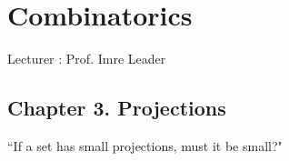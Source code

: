 \documentclass[12pt,a4paper]{report}
\DeclarePairedDelimiter\bignorm{\lVert}{\rVert}
\newcommand{\doublerule}[1][.4pt]{%
  \noindent
  \makebox[0pt][l]{\rule[.7ex]{\linewidth}{#1}}%
  \rule[.3ex]{\linewidth}{#1}}
\begin{document}
\newcommand{\thm}{\textbf{Theorem) }}
\newcommand{\thmnum}[1]{\textbf{Theorem #1) }}
\newcommand{\defi}{\textbf{Definition) }}
\newcommand{\lem}{\textbf{Lemma) }}
\newcommand{\lemnum}[1]{\textbf{Lemma #1) }}
\newcommand{\prop}{\textbf{Proposition) }}
\newcommand{\propnum}[1]{\textbf{Proposition #1) }}
\newcommand{\cor}{\textbf{Corollary) }}
\newcommand{\cornum}[1]{\textbf{Corollary #1) }}


\newcommand{\pf}{\textbf{proof) }}
\newcommand{\eop}{\hfill  \textsl{(End of proof)} $\square$} %


\newcommand{\lap}{\triangle} %
\newcommand{\s}{\vspace{10pt}}
\newcommand{\bull}{$\bullet$}
\newcommand{\sta}{$\star$}
\newcommand{\reals}{\mathbb{R}}

\newcommand{\intN}{\mathbb{Z}_N}
\newcommand{\norms}[2]{\bignorm[\big]{#1}_{#2}}
\newcommand{\avg}{\mathbb{E}}
\newcommand{\prob}{\mathbb{P}}
\newcommand{\osc}{\text{\osc}}

\renewcommand{\P}{\mathscr{P}}


\newcommand{\boxnorm}[1]{\norms{#1}{\tiny{\square}}}
\newcommand{\boxinn}[4]{\begin{array}{|cc|} 
\cline{1-2}
#1 & #2 \\
#3 & #4 \\
\cline{1-2}
\end{array}}

\newcommand{\newday}{\doublerule[0.5pt]}
\newcommand{\digression}{**********************************************************************************************}

\renewcommand{\bar}{\overline}

\setlength\parindent{0pt}

\chapter*{Combinatorics}
\s

Lecturer : Prof. Imre Leader
\s


\section*{Chapter 3. Projections}
``If a set has small projections, must it be small?"
\end{document}

